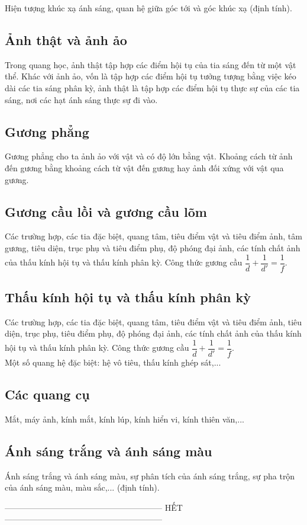 \documentclass{article}
\begin{document}
\begin{multicols}{2}
Hiện tượng khúc xạ ánh sáng, quan hệ giữa góc tới và góc khúc xạ (định tính).

\subsection{Ảnh thật và ảnh ảo}

Trong quang học, ảnh thật tập hợp các điểm hội tụ của tia sáng đến từ một vật thể. Khác với ảnh ảo, vốn là tập hợp các điểm hội tụ tưởng tượng bằng việc kéo dài các tia sáng phân kỳ, ảnh thật là tập hợp các điểm hội tụ thực sự của các tia sáng, nơi các hạt ánh sáng thực sự đi vào.

\subsection{Gương phẳng}

Gương phẳng cho ta ảnh ảo với vật và có độ lớn bằng vật.
Khoảng cách từ ảnh đến gương bằng khoảng cách từ vật đến gương hay ảnh đối xứng với vật qua gương.

\subsection{Gương cầu lồi và gương cầu lõm}

Các trường hợp, các tia đặc biệt, quang tâm, tiêu điểm vật và tiêu điểm ảnh, tâm gương, tiêu diện, trục phụ và tiêu điểm phụ, độ phóng đại ảnh, các tính chất ảnh của thấu kính hội tụ và thấu kính phân kỳ. Công thức gương cầu $\dfrac{1}{d}+\dfrac{1}{d'}=\dfrac{1}{f}$.

\subsection{Thấu kính hội tụ và thấu kính phân kỳ}

Các trường hợp, các tia đặc biệt, quang tâm, tiêu điểm vật và tiêu điểm ảnh, tiêu diện, trục phụ, tiêu điểm phụ, độ phóng đại ảnh, các tính chất ảnh của thấu kính hội tụ và thấu kính phân kỳ. Công thức gương cầu $\dfrac{1}{d}+\dfrac{1}{d'}=\dfrac{1}{f}$. \\
Một số quang hệ đặc biệt: hệ vô tiêu, thấu kính ghép sát,...

\subsection{Các quang cụ}

Mắt, máy ảnh, kính mắt, kính lúp, kính hiển vi, kính thiên văn,...

\subsection{Ánh sáng trắng và ánh sáng màu}

Ánh sáng trắng và ánh sáng màu, sự phân tích của ánh sáng trắng, sự pha trộn của ánh sáng màu, màu sắc,... (định tính).

\end{multicols}

\vspace{10mm}

\begin{center}
    --------------------------------------------------------- HẾT ---------------------------------------------------------
\end{center}
\end{document}
